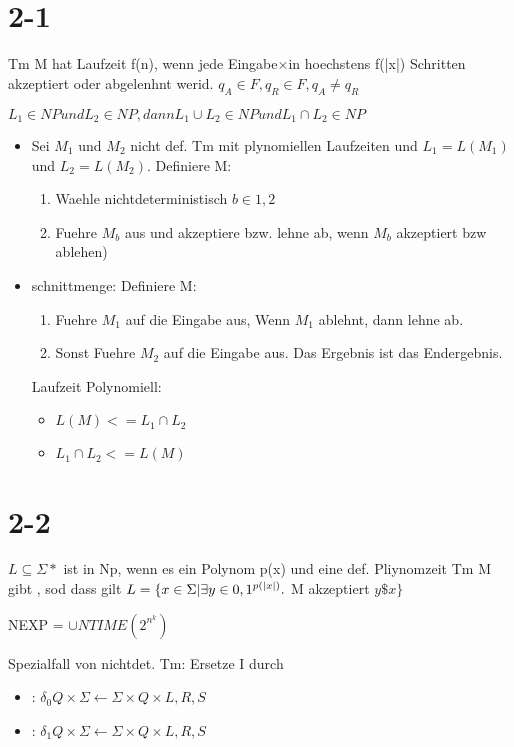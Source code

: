 \documentclass[12pt, oneside, a4paper, numbers=enddot, abstracton, parskip=full]{scrreprt}
\begin{document}



\section{2-1}
Tm M hat Laufzeit f(n), wenn jede Eingabe$\times$in hoechstens f(|x|) Schritten akzeptiert oder abgelenhnt werid.
$q_A \in F, q_R \in F, q_A \neq q_R$

$L_1 \in NP und L_2 \in NP, dann L_1 \cup L_2 \in NP und L_1 \cap L_2 \in NP$

\begin{itemize}
\item Sei $M_1$ und $M_2$ nicht def. Tm mit plynomiellen Laufzeiten
  und $L_1 = L(M_1)$ und $L_2 = L(M_2)$. Definiere M:
\begin{enumerate}
\item Waehle nichtdeterministisch $b \in {1,2}$
\item Fuehre $M_b$ aus und akzeptiere bzw. lehne ab, wenn $M_b$
  akzeptiert bzw ablehen)
\end{enumerate}
\item schnittmenge: Definiere M:
  \begin{enumerate}
  \item Fuehre $M_1$ auf die Eingabe aus, Wenn $M_1$ ablehnt, dann
    lehne ab.
  \item Sonst Fuehre $M_2$ auf die Eingabe aus. Das Ergebnis ist das Endergebnis.
  \end{enumerate}

  Laufzeit Polynomiell:
  \begin{itemize}
  \item $L(M) <= L_1\cap L_2$
  \item $L_1 \cap L_2 <= L(M)$
  \end{itemize}

\end{itemize}

\section{2-2}
$L\subseteq \Sigma*$ ist in Np, wenn es ein Polynom p(x) und eine
def. Pliynomzeit Tm M gibt , sod dass gilt
$ L=\{x \in \Sigma\* | \exists  y \in {0,1}^{p(|x|)}.$ M akzeptiert $y \$x\}$

NEXP = $\cup NTIME(2^{n^{k}})$

Spezialfall von nichtdet. Tm:
Ersetze I durch
\begin{itemize}
\item : $ \delta_0 Q \times \Sigma \leftarrow \Sigma \times Q \times
{L,R,S} $
\item : $ \delta_1 Q \times \Sigma \leftarrow \Sigma \times Q \times
{L,R,S} $

\end{itemize}
\end{document}
